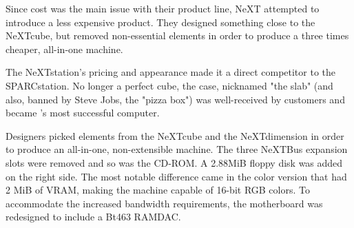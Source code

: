 Since cost was the main issue with their product line, NeXT attempted to introduce a less expensive product. They designed something close to the NeXTcube, but removed non-essential elements in order to produce a three times cheaper, all-in-one machine.\\
\par
The NeXTstation's pricing and appearance made it a direct competitor to the SPARCstation. No longer a perfect cube, the case, nicknamed "the slab" (and also, banned by Steve Jobs, the "pizza box") was well-received by customers and became \NeXTns{}'s most successful computer.\\
\par 
{}
\par
\vspace{-10pt}
Designers picked elements from the NeXTcube and the NeXTdimension in order to produce an all-in-one, non-extensible machine. The three NeXTBus expansion slots were removed and so was the CD-ROM. A 2.88MiB floppy disk was added on the right side. The most notable difference came in the color version that had 2 MiB of VRAM, making the machine capable of 16-bit RGB colors. To accommodate the increased bandwidth requirements, the motherboard was redesigned to include a Bt463 RAMDAC.\\
\par




